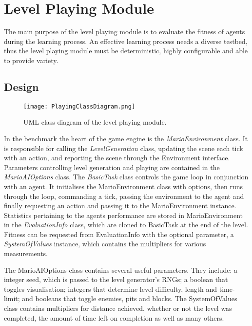 
\section{Level Playing Module}

The main purpose of the level playing module is to evaluate the fitness of agents during the learning process. An effective learning process needs a diverse testbed, thus the level playing module must be deterministic, highly configurable and able to provide variety. 


\subsection{Design}

\begin{figure}[t]
	\centering
	\texttt{[image: PlayingClassDiagram.png]}
	\caption{UML class diagram of the level playing module.}
	\label{fig:pumlcd}
\end{figure}

In the benchmark the heart of the game engine is the \emph{MarioEnvironment} class. It is responsible for calling the \emph{LevelGeneration} class, updating the scene each tick with an action, and reporting the scene through the Environment interface. Parameters controlling level generation and playing are contained in the \emph{MarioAIOptions} class. The \emph{BasicTask} class controls the game loop in conjunction with an agent. It initialises the MarioEnvironment class with options, then runs through the loop, commanding a tick, passing the environment to the agent and finally requesting an action and passing it to the MarioEnvironment instance. Statistics pertaining to the agents performance are stored in MarioEnvironment in the \emph{EvaluationInfo} class, which are cloned to BasicTask at the end of the level. Fitness can be requested from EvaluationInfo with the optional parameter, a \emph{SystemOfValues} instance, which contains the multipliers for various measurements.

The MarioAIOptions class contains several useful parameters. They include: a integer seed, which is passed to the level generator's RNGs; a boolean that toggles visualisation; integers that determine level difficulty, length and time-limit; and booleans that toggle enemies, pits and blocks. The SystemOfValues class contains multipliers for  distance achieved, whether or not the level was completed, the amount of time left on completion as well as many others.

